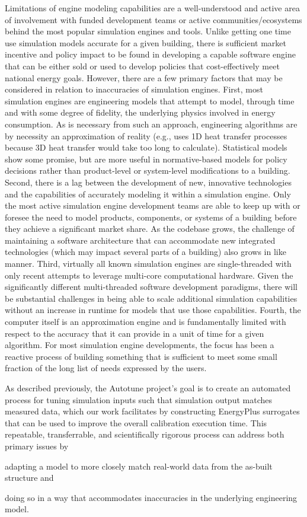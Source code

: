 \documentclass[preprint, review, 12pt]{elsarticle}
\begin{document}
Limitations of engine modeling capabilities are a well-understood and active area of involvement with funded development teams or active communities/ecosystems behind the most popular simulation engines and tools. Unlike getting one time use simulation models accurate for a given building, there is sufficient market incentive and policy impact to be found in developing a capable software engine that can be either sold or used to develop policies that cost-effectively meet national energy goals. However, there are a few primary factors that may be considered in relation to inaccuracies of simulation engines. First, most simulation engines are engineering models that attempt to model, through time and with some degree of fidelity, the underlying physics involved in energy consumption. As is necessary from such an approach, engineering algorithms are by necessity an approximation of reality (e.g., uses 1D heat transfer processes because 3D heat transfer would take too long to calculate). Statistical models show some promise, but are more useful in normative-based models for policy decisions rather than product-level or system-level modifications to a building. Second, there is a lag between the development of new, innovative technologies and the capabilities of accurately modeling it within a simulation engine. Only the most active simulation engine development teams are able to keep up with or foresee the need to model products, components, or systems of a building before they achieve a significant market share. As the codebase grows, the challenge of maintaining a software architecture that can accommodate new integrated technologies (which may impact several parts of a building) also grows in like manner. Third, virtually all known simulation engines are single-threaded with only recent attempts to leverage multi-core computational hardware. Given the significantly different multi-threaded software development paradigms, there will be substantial challenges in being able to scale additional simulation capabilities without an increase in runtime for models that use those capabilities. Fourth, the computer itself is an approximation engine and is fundamentally limited with respect to the accuracy that it can provide in a unit of time for a given algorithm. For most simulation engine developments, the focus has been a reactive process of building something that is sufficient to meet some small fraction of the long list of needs expressed by the users.

As described previously, the Autotune project's \cite{cit:new2012} goal is to create an automated process for tuning simulation inputs such that simulation output matches measured data, which our work facilitates by constructing EnergyPlus surrogates that can be used to improve the overall calibration execution time. This repeatable, transferrable, and scientifically rigorous process can address both primary issues by 
\begin{inparaenum}[1)]
\item adapting a model to more closely match real-world data from the as-built structure and 
\item doing so in a way that accommodates inaccuracies in the underlying engineering
model.
\end{inparaenum}
\end{document}
